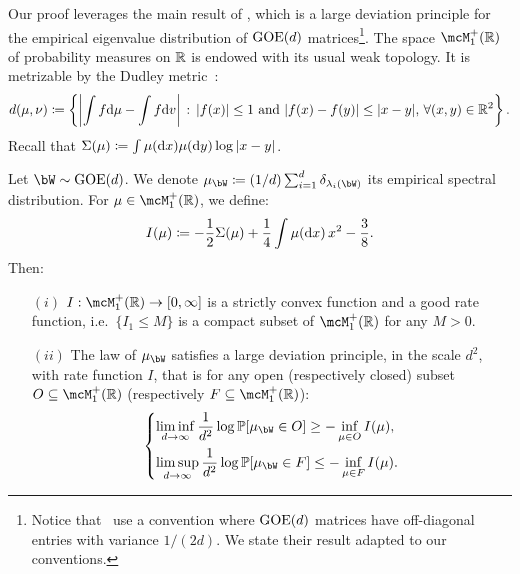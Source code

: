 \myskip 
Our proof leverages the main result of \cite{arous1997large}, which is a large deviation principle for the empirical eigenvalue distribution of $\mathrm{GOE}(d)$ matrices\footnote{
    Notice that~\cite{arous1997large} use a convention where $\mathrm{GOE}(d)$ matrices have off-diagonal entries with variance $1/(2d)$. We state their result adapted to our conventions.
}.
The space $\mcM_1^+(\bbR)$ of probability measures on $\mathbb{R}$ is endowed with its usual weak topology. 
It is metrizable by the Dudley metric~\citep{bogachev2007measure}:
\begin{equation}
    \label{eq:dudley}
    d(\mu, \nu) \coloneqq \left\{\left|\int f \mathrm{d} \mu - \int f \mathrm{d} v\right| \, : \, |f(x)| \leq 1 \textrm{ and } |f(x) - f(y)| \leq |x - y|, \, \forall (x, y) \in \mathbb{R}^2\right\}.
\end{equation}
Recall that $\Sigma(\mu) \coloneqq \int \mu(\mathrm{d} x) \mu(\mathrm{d} y) \log |x-y|$.
\begin{proposition}\label{prop:ldp_emeasure}
    Let $\bW \sim \GOE(d)$. 
    We denote $\mu_{\bW} \coloneqq (1/d) \sum_{i=1}^d \delta_{\lambda_i(\bW)}$ its empirical spectral distribution. 
    For $\mu \in \mcM_1^+(\bbR)$, we define: 
    \begin{equation}
        \label{eq:def_I}
        I(\mu) \coloneqq -\frac{1}{2} \Sigma(\mu) + \frac{1}{4} \int \mu(\mathrm{d} x) \, x^2 - \frac{3}{8}.
    \end{equation}
    Then: 
    \begin{itemize}
        \item[$(i)$] $I : \mcM_1^+(\bbR) \to [0, \infty]$ is a strictly convex function and a good rate function, i.e.\  
        $\{I_1 \leq M\}$ is a compact subset of $\mcM_1^+(\bbR)$ for any $M > 0$.
        \item[$(ii)$]
        The law of $\mu_\bW$ satisfies a large deviation principle, in the scale $d^2$, with rate function $I$, that is for any 
        open (respectively closed) subset $O \subseteq \mcM_1^+(\bbR)$ (respectively $F \subseteq \mcM_1^+(\bbR)$): 
        \begin{equation*}
            \begin{dcases}
                \liminf_{d\to\infty} \frac{1}{d^2} \log \bbP[\mu_\bW \in O] \geq - \inf_{\mu \in O} I(\mu), \\
                \limsup_{d\to\infty} \frac{1}{d^2} \log \bbP[\mu_\bW \in F] \leq - \inf_{\mu \in F} I(\mu).
            \end{dcases}
        \end{equation*}
    \end{itemize}
\end{proposition}

